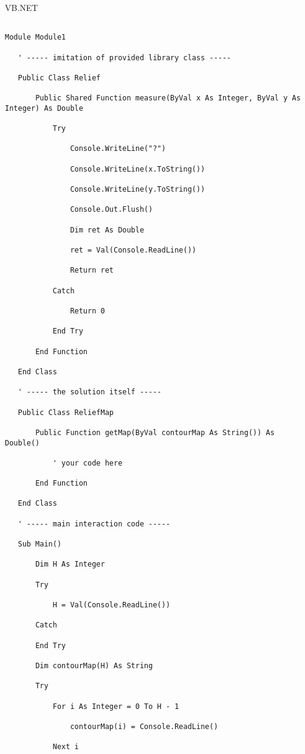 VB.NET

\begin{verbatim}

Module Module1

   ' ----- imitation of provided library class -----

   Public Class Relief

       Public Shared Function measure(ByVal x As Integer, ByVal y As Integer) As Double

           Try

               Console.WriteLine("?")

               Console.WriteLine(x.ToString())

               Console.WriteLine(y.ToString())

               Console.Out.Flush()

               Dim ret As Double

               ret = Val(Console.ReadLine())

               Return ret

           Catch

               Return 0

           End Try

       End Function

   End Class

   ' ----- the solution itself -----

   Public Class ReliefMap

       Public Function getMap(ByVal contourMap As String()) As Double()

           ' your code here

       End Function

   End Class

   ' ----- main interaction code -----

   Sub Main()

       Dim H As Integer

       Try

           H = Val(Console.ReadLine())

       Catch

       End Try

       Dim contourMap(H) As String

       Try

           For i As Integer = 0 To H - 1

               contourMap(i) = Console.ReadLine()

           Next i


\end{verbatim}
